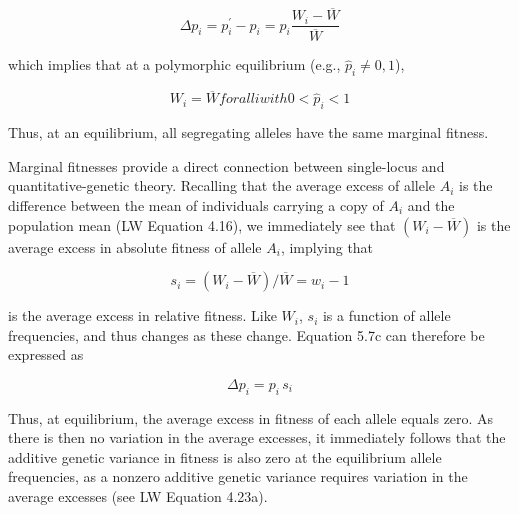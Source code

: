 \documentclass{article}
\begin{document}
\begin{equation}
\Delta p_{i}=p_{i}^{\prime}-p_{i}=p_{i}\frac{W_{i}-\overline{W}}{\overline{W}}
\tag{5.7c}
\label{eq:5_7c}
\end{equation}

which implies that at a polymorphic equilibrium (e.g.,  $ \hat{p}_i \neq 0, 1 $),

\begin{equation}
W_{i}=\overline{W}for all i with0<\widehat{p}_{i}<1
\tag{5.7d}
\label{eq:5_7d}
\end{equation}

Thus, at an equilibrium, all segregating alleles have the same marginal fitness.

Marginal fitnesses provide a direct connection between single-locus and quantitative-genetic theory. Recalling that the average excess of allele  $ A_i $ is the difference between the mean of individuals carrying a copy of  $ A_i $ and the population mean (LW Equation 4.16), we immediately see that  $ (W_i - \overline{W}) $ is the average excess in absolute fitness of allele  $ A_i $, implying that

\begin{equation}
s_{i}=\left(W_{i}-\overline{W}\right)/\overline{W}=w_{i}-1
\tag{5.8a}
\label{eq:5_8a}
\end{equation}

is the average excess in relative fitness. Like  $ W_{i} $,  $ s_{i} $ is a function of allele frequencies, and thus changes as these change. Equation 5.7c can therefore be expressed as

\begin{equation}
\Delta p_{i}=p_{i}\,s_{i}
\tag{5.8b}
\label{eq:5_8b}
\end{equation}

Thus, at equilibrium, the average excess in fitness of each allele equals zero. As there is then no variation in the average excesses, it immediately follows that the additive genetic variance in fitness is also zero at the equilibrium allele frequencies, as a nonzero additive genetic variance requires variation in the average excesses (see LW Equation 4.23a).
\end{document}
